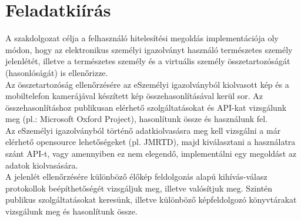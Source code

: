 \section{Feladatkiírás}
A szakdolgozat célja a felhasználó hitelesítési megoldás implementációja oly módon, hogy az elektronikus személyi igazolványt használó természetes személy jelenlétét, illetve a természetes személy és a virtuális személy összetartozóságát (hasonlóságát) is ellenőrizze.
\\Az összetartozóság ellenőrzésére az eSzemélyi igazolványból kiolvasott kép és a mobiltelefon kamerájával készített kép összehasonlításával kerül sor. Az összehasonlításhoz publikusan elérhető szolgáltatásokat és API-kat vizsgálunk meg (pl.: Microsoft Oxford Project), hasonlítunk össze és használunk fel.
\\Az eSzemélyi igazolványból történő adatkiolvasásra meg kell vizsgálni a már elérhető opensource lehetőségeket (pl. JMRTD), majd kiválasztani a használatra szánt API-t, vagy amennyiben ez nem elegendő, implementálni egy megoldást az adatok kiolvasására.
\\A jelenlét ellenőrzésére különböző élőkép feldolgozás alapú kihívás-válasz protokollok beépíthetőségét vizsgáljuk meg, illetve valósítjuk meg. Szintén publikus szolgáltatásokat keresünk, illetve különböző képfeldolgozó könyvtárakat vizsgálunk meg és hasonlítunk össze.
\newpage
